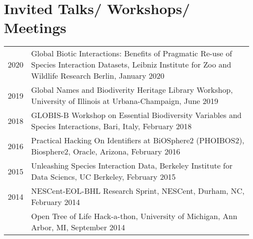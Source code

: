 \documentclass[11pt,fullpage]{article}
\begin{document}


\section*{Invited Talks/ Workshops/ Meetings}

\begin{longtable}{p{0.5in}|p{5.5in}}

 
 2020 & Global Biotic Interactions: Benefits of Pragmatic Re-use of Species Interaction Datasets, Leibniz Institute for Zoo and Wildlife Research Berlin, January 2020 \\

 2019 & Global Names and Biodiverity Heritage Library Workshop, University of Illinois at Urbana-Champaign, June 2019 \\

 2018 
 & GLOBIS-B Workshop on Essential Biodiversity Variables and Species Interactions, Bari, Italy, February 2018 \\ 

 2016 &  Practical Hacking On Identifiers at BiOSphere2 (PHOIBOS2), Biosphere2, Oracle, Arizona, February 2016 \\
 
 2015 &  Unleashing Species Interaction Data, Berkeley Institute for Data Sciencs, UC Berkeley, February 2015 \\

 2014 & NESCent-EOL-BHL Research Sprint, NESCent, Durham, NC, February 2014 \\ 
  & Open Tree of Life Hack-a-thon, University of Michigan, Ann Arbor, MI, September 2014 \\ 

\end{longtable}




\end{document}
